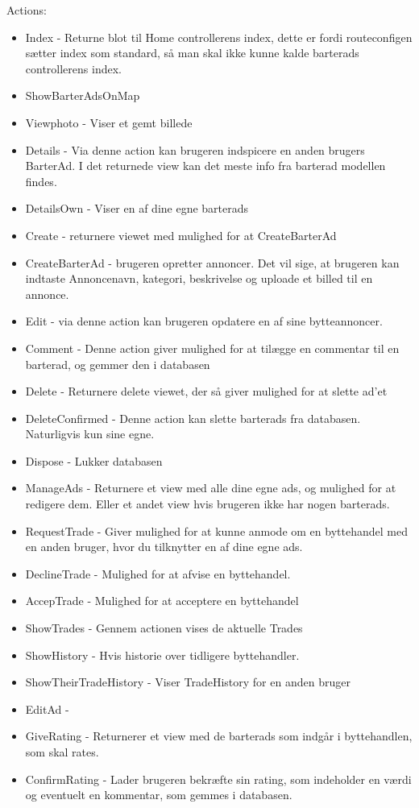 Actions:
\begin{itemize}
	\item Index - Returne blot til Home controllerens index, dette er fordi routeconfigen sætter index som standard, så man skal ikke kunne kalde barterads controllerens index.
	\item ShowBarterAdsOnMap
	\item Viewphoto - Viser et gemt billede
	\item Details - Via denne action kan brugeren indspicere en anden brugers  BarterAd. I det returnede view kan det meste info fra barterad modellen findes.
	\item DetailsOwn - Viser en af dine egne barterads
	\item Create - returnere viewet med mulighed for at CreateBarterAd
	\item CreateBarterAd - brugeren opretter annoncer. Det vil sige, at brugeren kan indtaste Annoncenavn, kategori, beskrivelse og uploade et billed til en annonce. 
	\item Edit - via denne action kan brugeren opdatere en af sine bytteannoncer.
	\item Comment - Denne action giver mulighed for at tilægge en commentar til en barterad, og gemmer den i databasen
	\item Delete - Returnere delete viewet, der så giver mulighed for at slette ad'et 
	\item DeleteConfirmed - Denne action kan slette barterads fra databasen. Naturligvis kun sine egne. 
	\item Dispose - Lukker databasen
	\item ManageAds - Returnere et view med alle dine egne ads, og mulighed for at redigere dem. Eller et andet view hvis brugeren ikke har nogen barterads. 
	\item RequestTrade - Giver mulighed for at kunne anmode om en byttehandel med en anden bruger, hvor du tilknytter en af dine egne ads.
	\item DeclineTrade - Mulighed for at afvise en byttehandel. 
	\item AccepTrade - Mulighed for at acceptere en byttehandel
	\item ShowTrades - Gennem actionen vises de aktuelle Trades
	\item ShowHistory - Hvis historie over tidligere byttehandler.
	\item ShowTheirTradeHistory - Viser TradeHistory for en anden bruger
	
	\item EditAd - 
	\item GiveRating - Returnerer et view med de barterads som indgår i byttehandlen, som skal rates.
	\item ConfirmRating - Lader brugeren bekræfte sin rating, som indeholder en værdi og eventuelt en kommentar, som gemmes i databasen.
\end{itemize}

